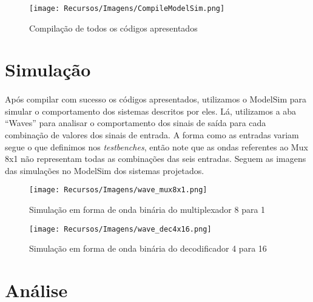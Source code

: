 \documentclass[a4paper,12pt]{article}
\begin{document}
\begin{figure}[H]
    \centering
    \texttt{[image: Recursos/Imagens/CompileModelSim.png]}
    \caption{Compilação de todos os códigos apresentados}
\end{figure}

\newpage

\section{Simulação}
\paragraph{}
Após compilar com sucesso os códigos apresentados, utilizamos o ModelSim para simular o comportamento dos sistemas descritos por eles. Lá, utilizamos a aba ``Waves'' para analisar o comportamento dos sinais de saída para cada combinação de valores dos sinais de entrada. A forma como as entradas variam segue o que definimos nos \textit{testbenches}, então note que as ondas referentes ao Mux 8x1 não representam todas as combinações das seis entradas. Seguem as imagens das simulações no ModelSim dos sistemas projetados.

\begin{figure}[H]
    \centering
    \begin{tcolorbox}[colframe=cinza, colback=white, boxrule=0.75pt, arc=0pt, width=1\textwidth, center, boxsep=0pt, left=0pt, right=0pt, top=0pt, bottom=0pt]
    \texttt{[image: Recursos/Imagens/wave\_mux8x1.png]}
    \end{tcolorbox}
    \caption{Simulação em forma de onda binária do multiplexador 8 para 1}
\end{figure}

\begin{figure}[H]
    \centering
    \begin{tcolorbox}[colframe=cinza, colback=white, boxrule=0.75pt, arc=0pt, width=1\textwidth, center, boxsep=0pt, left=0pt, right=0pt, top=0pt, bottom=0pt]
    \texttt{[image: Recursos/Imagens/wave\_dec4x16.png]}
    \end{tcolorbox}
    \caption{Simulação em forma de onda binária do decodificador 4 para 16}
\end{figure}

\section{Análise}
\end{document}
